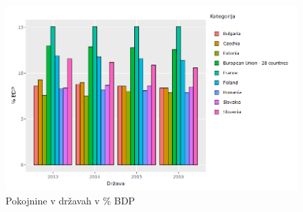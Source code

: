 \documentclass[10pt]{beamer}
\begin{document}
\begin{frame}
\begin{figure}[h!]
\centering
\includegraphics[width = 12 cm]{pokojnine_bdp.png}
\caption{Pokojnine v državah v \% BDP}
\label{Slika 11}
\end{figure}
\end{frame}
\end{document}
